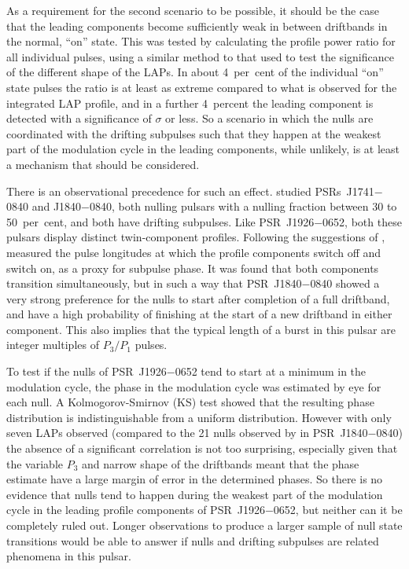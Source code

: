 As a requirement for the second scenario to be possible, it should be the case that the leading components become sufficiently weak in between driftbands in the normal, ``on'' state. This was tested by calculating the profile power ratio for all individual pulses, using a similar method to that used to test the significance of the different shape of the LAPs. In about 4~per~cent of the individual ``on'' state pulses the ratio is at least as extreme compared to what is observed for the integrated LAP profile, and in a further 4~percent the leading component is detected with a significance of $\sigma$ or less. So a scenario in which the nulls are coordinated with the drifting subpulses such that they happen at the weakest part of the modulation cycle in the leading components, while unlikely, is at least a mechanism that should be considered.

There is an observational precedence for such an effect. \citet{GYY+2017} studied PSRs~J1741$-$0840 and J1840$-$0840, both nulling pulsars with a nulling fraction between 30 to 50~per~cent, and both have drifting subpulses. Like PSR~J1926$-$0652, both these pulsars display distinct twin-component profiles. 
Following the suggestions of \citet{JVxx2000}, \citet{GYY+2017} measured the pulse longitudes at which the profile components switch off and switch on, as a proxy for subpulse phase. 
It was found that both components transition simultaneously, but in such a way that PSR~J1840$-$0840 showed a very strong preference for the nulls to start after completion of a full driftband, and have a high probability of finishing at the start of a new driftband in either component. This also implies that the typical length of a burst in this pulsar are integer multiples of $P_3/P_1$ pulses.

To test if the nulls of PSR~J1926$-$0652 tend to start at a minimum in the modulation cycle, the phase in the modulation cycle was estimated by eye for each null. A Kolmogorov-Smirnov (KS) test showed that the resulting phase distribution is indistinguishable from a uniform distribution. However with only seven LAPs observed (compared to the 21 nulls observed by \citealt{GYY+2017} in PSR~J1840$-$0840) the absence of a significant correlation is not too surprising, especially given that the variable $P_3$ and narrow shape of the driftbands meant that the phase estimate have a large margin of error in the determined phases. So there is no evidence that nulls tend to happen during the weakest part of the modulation cycle in the leading profile components of PSR~J1926$-$0652, but neither can it be completely ruled out. Longer observations to produce a larger sample of null state transitions would be able to answer if nulls and drifting subpulses are related phenomena in this pulsar. 


